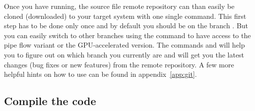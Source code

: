 \documentclass[a4paper, 11pt, DIV=11]{scrartcl}
\begin{document}
Once you have  running, the \nsc source file remote
repository can than easily be cloned (downloaded) to your target
system with one single command. This first step has to be done
only once and by default you should be on the branch .
But you can easily switch to other branches using the
 command to have access to the pipe flow variant
or the GPU-accelerated \cuda version. The
 commands  and  will help you
to figure out on which branch you currently are and will get you
the latest changes (\eg bug fixes or new features) from the remote
repository. A few more helpful hints on how to use  can
be found in appendix~\ref{app:git}.  

\subsection{Compile the code}
\label{sec:compile}
\end{document}
